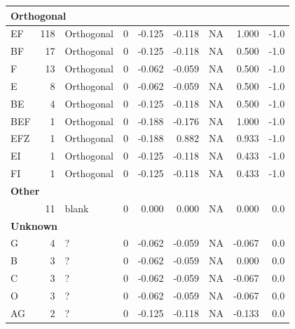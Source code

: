 \documentclass[
  letterpaper,
  DIV=11,
  numbers=noendperiod]{scrreprt}
\begin{document}
\begin{tabular}[t]{l|r|l|r|r|r|r|r|r}
\hline
\multicolumn{9}{l}{\textbf{Orthogonal}}\\
\hline
\hspace{1em}EF & 118 & Orthogonal & 0 & -0.125 & -0.118 & NA & 1.000 & -1.0\\
\hline
\hspace{1em}BF & 17 & Orthogonal & 0 & -0.125 & -0.118 & NA & 0.500 & -1.0\\
\hline
\hspace{1em}F & 13 & Orthogonal & 0 & -0.062 & -0.059 & NA & 0.500 & -1.0\\
\hline
\hspace{1em}E & 8 & Orthogonal & 0 & -0.062 & -0.059 & NA & 0.500 & -1.0\\
\hline
\hspace{1em}BE & 4 & Orthogonal & 0 & -0.125 & -0.118 & NA & 0.500 & -1.0\\
\hline
\hspace{1em}BEF & 1 & Orthogonal & 0 & -0.188 & -0.176 & NA & 1.000 & -1.0\\
\hline
\hspace{1em}EFZ & 1 & Orthogonal & 0 & -0.188 & 0.882 & NA & 0.933 & -1.0\\
\hline
\hspace{1em}EI & 1 & Orthogonal & 0 & -0.125 & -0.118 & NA & 0.433 & -1.0\\
\hline
\hspace{1em}FI & 1 & Orthogonal & 0 & -0.125 & -0.118 & NA & 0.433 & -1.0\\
\hline
\multicolumn{9}{l}{\textbf{Other}}\\
\hline
\hspace{1em} & 11 & blank & 0 & 0.000 & 0.000 & NA & 0.000 & 0.0\\
\hline
\multicolumn{9}{l}{\textbf{Unknown}}\\
\hline
\hspace{1em}G & 4 & ? & 0 & -0.062 & -0.059 & NA & -0.067 & 0.0\\
\hline
\hspace{1em}B & 3 & ? & 0 & -0.062 & -0.059 & NA & 0.000 & 0.0\\
\hline
\hspace{1em}C & 3 & ? & 0 & -0.062 & -0.059 & NA & -0.067 & 0.0\\
\hline
\hspace{1em}O & 3 & ? & 0 & -0.062 & -0.059 & NA & -0.067 & 0.0\\
\hline
\hspace{1em}AG & 2 & ? & 0 & -0.125 & -0.118 & NA & -0.133 & 0.0\\

\end{tabular}
\end{document}
